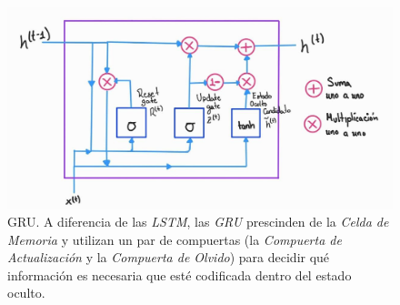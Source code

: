 \begin{figure}[ht!]
\centering
\includegraphics[width=1.0 \textwidth]{Chapters/2. Transformer/Figures/rnn/GRU.jpg}
\caption{GRU. A diferencia de las \textit{LSTM}, las \textit{GRU} prescinden de la
         \textit{Celda de Memoria} y utilizan un par de compuertas (la \textit{Compuerta de
         Actualización} y la \textit{Compuerta de Olvido}) para decidir qué información es necesaria
         que esté codificada dentro del estado oculto.}
\label{fig:rnn_gru}
\end{figure}
